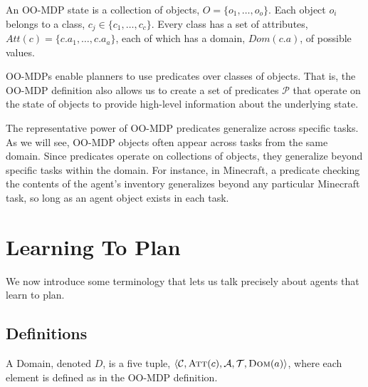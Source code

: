 \documentclass[11pt]{article}
\begin{document}
An OO-MDP state is a collection of objects, $O = \{o_1, \ldots, o_o \}$.  Each object
$o_i$ belongs to a class, $c_j \in \{c_1, \ldots, c_c\}$. Every class
has a set of attributes, $Att(c) = \{c.a_1, \ldots, c.a_a \}$, each of
which has a domain, $Dom(c.a)$, of possible values. 

OO-MDPs enable planners to use predicates over classes of objects. That is, the
OO-MDP definition also allows us to create a set of predicates $\mathcal{P}$ that
operate on the state of objects to provide high-level
information about the underlying state.

The representative power of OO-MDP predicates generalize across specific tasks. As we will see, OO-MDP objects
often appear across tasks from the same domain. Since predicates operate on collections
of objects, they generalize beyond specific tasks within the domain.
For instance, in Minecraft, a predicate checking the contents of the agent's inventory
generalizes beyond any particular Minecraft task, so long as an agent object exists in each task.
%
%
%


\section{Learning To Plan}
\label{sec:learning_to_plan}

We now introduce some terminology that lets us talk precisely about agents that learn to plan.

\subsection{Definitions}
{ A \textup{Domain}, denoted $D$, is a five tuple, $\langle \mathcal{C}, \textsc{Att}(c), \mathcal{A}, \mathcal{T}, \textsc{Dom}(a) \rangle$, where each element is defined as in the OO-MDP definition.} 

\end{document}
